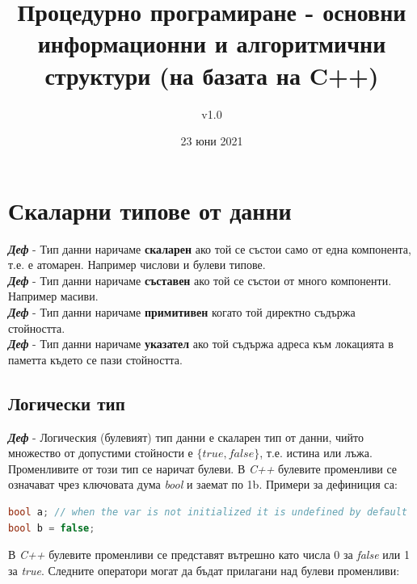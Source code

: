 \documentclass[fleqn,12pt]{article}
\title{Процедурно програмиране - основни информационни и алгоритмични структури (на базата на C++)}
\author{v1.0}
\date{23 юни 2021}
\begin{document}
\maketitle

\tableofcontents
\pagebreak

\section{Скаларни типове от данни}

\noindent \textit{\textbf{Деф}} - Тип данни наричаме \textbf{скаларен} ако той се състои само от една компонента, т.е. е атомарен. Например числови и булеви типове. \\
\noindent \textit{\textbf{Деф}} - Тип данни наричаме \textbf{съставен} ако той се състои от много компоненти. Например масиви. \\
\noindent \textit{\textbf{Деф}} - Тип данни наричаме \textbf{примитивен} когато той директно съдържа стойността. \\
\noindent \textit{\textbf{Деф}} - Тип данни наричаме \textbf{указател} ако той съдържа адреса към локацията в паметта където се пази стойността. \\

\subsection{Логически тип}

\noindent \textit{\textbf{Деф}} - Логическия (булевият) тип данни е скаларен тип от данни, чийто множество от допустими стойности е $\{true, false\}$, т.е. истина или лъжа. 
Променливите от този тип се наричат булеви.
\bigbreak
В \textit{C++} булевите променливи се означават чрез ключовата дума \textit{bool} и заемат по 1b. Примери за дефиниция са:

\begin{lstlisting}[language=C++, caption=Bool variables]
bool a; // when the var is not initialized it is undefined by default
bool b = false;
\end{lstlisting}

В \textit{C++} булевите променливи се представят вътрешно като числа 0 за \textit{false} или 1 за \textit{true}.
Следните оператори могат да бъдат прилагани над булеви променливи:
\end{document}
